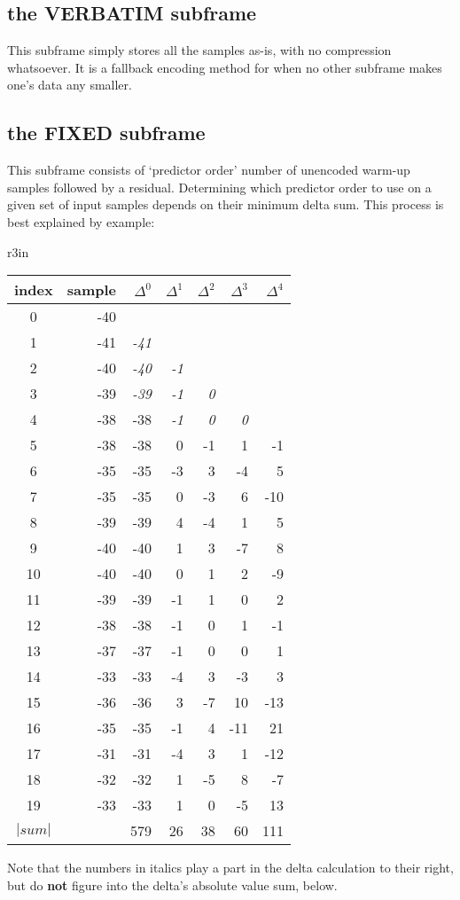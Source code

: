 \subsection{the VERBATIM subframe}

This subframe simply stores all the samples as-is,
with no compression whatsoever.
It is a fallback encoding method for when no other subframe makes one's
data any smaller.

\subsection{the FIXED subframe}

This subframe consists of `predictor order' number of unencoded
warm-up samples followed by a residual.
Determining which predictor order to use on a given set of input samples
depends on their minimum delta sum.
This process is best explained by example:


\begin{wrapfigure}{r}{3in}
{
\begin{tabular}{|c|r|r|r|r|r|r|}
\hline
index & sample & $\Delta ^ 0$ & $\Delta ^ 1$ & $\Delta ^ 2$ & $\Delta ^ 3$ & $\Delta ^ 4$ \\
\hline
0 & -40 & & & & & \\
1 & -41 & \textit{-41} & & & & \\
2 & -40 & \textit{-40} & \textit{-1} & & & \\
3 & -39 & \textit{-39} & \textit{-1} & \textit{0} & & \\
4 & -38 & -38 & \textit{-1} & \textit{0} & \textit{0} & \\
5 & -38 & -38 & 0 & -1 & 1 & -1 \\
6 & -35 & -35 & -3 & 3 & -4 & 5 \\
7 & -35 & -35 & 0 & -3 & 6 & -10 \\
8 & -39 & -39 & 4 & -4 & 1 & 5 \\
9 & -40 & -40 & 1 & 3 & -7 & 8 \\
10 & -40 & -40 & 0 & 1 & 2 & -9 \\
11 & -39 & -39 & -1 & 1 & 0 & 2 \\
12 & -38 & -38 & -1 & 0 & 1 & -1 \\
13 & -37 & -37 & -1 & 0 & 0 & 1 \\
14 & -33 & -33 & -4 & 3 & -3 & 3 \\
15 & -36 & -36 & 3 & -7 & 10 & -13 \\
16 & -35 & -35 & -1 & 4 & -11 & 21 \\
17 & -31 & -31 & -4 & 3 & 1 & -12 \\
18 & -32 & -32 & 1 & -5 & 8 & -7 \\
19 & -33 & -33 & 1 & 0 & -5 & 13 \\
\hline
$| sum |$ &  & 579 & 26 & 38 & 60 & 111 \\
\hline
\end{tabular}
}
\end{wrapfigure}
Note that the numbers in italics play a part in the delta
calculation to their right, but do \textbf{not} figure into the
delta's absolute value sum, below.

